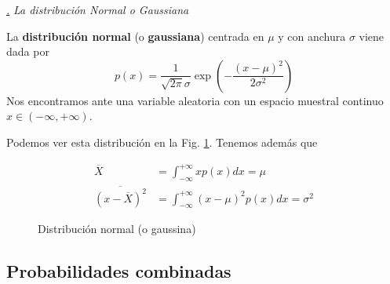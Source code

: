 \documentclass[a4paper,11pt]{book} %
\numberwithin{equation}{chapter}
\def\subsubiContadorIt{\par\addtocounter{subsubsection}{1}\underline{\it\thesubsubsection.}\hskip0.5cm \setcounter{subsubsubsectionIt}{0}}
\newcommand{\SubsubiIt}[1]{
		\subsubiContadorIt \textit{#1}
	}
\newcounter{subsubsubsectionIt}[subsubsection]
\begin{document}
			\SubsubiIt{La distribución Normal o Gaussiana}

\begin{mybox_gray2}{}
La \textbf{distribución normal} (o \textbf{gaussiana}) centrada en $\mu$ y con anchura $\sigma$ viene dada por
	\begin{equation}
	p(x) = \frac{1}{\sqrt{2\pi}\sigma} \exp \left({-\frac{(x-\mu)^2}{2\sigma^2}}\right)
	\end{equation}
Nos encontramos ante una variable aleatoria con un espacio muestral continuo $x\in (-\infty,+\infty)$. 
\end{mybox_gray2}

Podemos ver esta distribución en la Fig. \ref{Fig_formalismo_dist_normal}. Tenemos además que

	\begin{align}
	\overline{X} &= \int_{-\infty}^{+\infty} xp(x) dx = \mu \\
	\overline{(x-\overline X)^2} &= \int_{-\infty}^{+\infty} (x-\mu)^2 p(x)dx =\sigma^2
	\end{align}

\begin{figure}[h] \setcounter{subfigure}{0}
\centering
{}
\hspace{0.5cm}
\caption{Distribución normal (o gaussina)}
\label{Fig_formalismo_dist_normal}
\end{figure}





		\subsection{Probabilidades combinadas}
\end{document}
